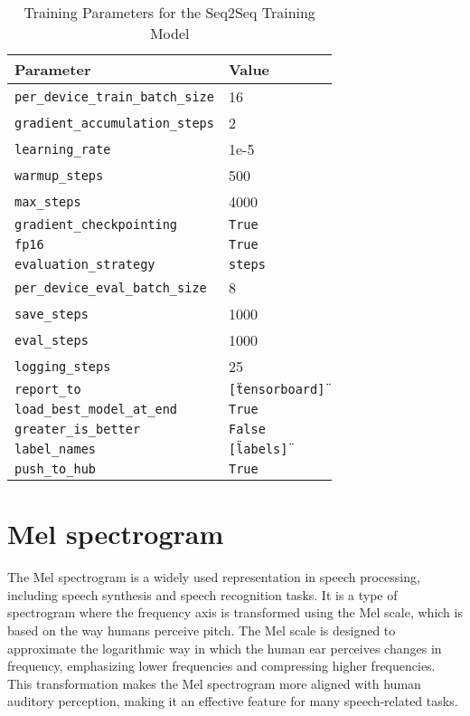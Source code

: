 \documentclass[12pt]{article}
\begin{document}
\begin{table}[ht!]
\centering
\begin{tabular}{|l|l|}
\hline
\textbf{Parameter} & \textbf{Value} \\ \hline
\texttt{per\_device\_train\_batch\_size} & 16 \\ \hline
\texttt{gradient\_accumulation\_steps} & 2 \\ \hline
\texttt{learning\_rate} & 1e-5 \\ \hline
\texttt{warmup\_steps} & 500 \\ \hline
\texttt{max\_steps} & 4000 \\ \hline
\texttt{gradient\_checkpointing} & \texttt{True} \\ \hline
\texttt{fp16} & \texttt{True} \\ \hline
\texttt{evaluation\_strategy} & \texttt{steps} \\ \hline
\texttt{per\_device\_eval\_batch\_size} & 8 \\ \hline
\texttt{save\_steps} & 1000 \\ \hline
\texttt{eval\_steps} & 1000 \\ \hline
\texttt{logging\_steps} & 25 \\ \hline
\texttt{report\_to} & \texttt{[\"tensorboard\"]} \\ \hline
\texttt{load\_best\_model\_at\_end} & \texttt{True} \\ \hline
\texttt{greater\_is\_better} & \texttt{False} \\ \hline
\texttt{label\_names} & \texttt{[\"labels\"]} \\ \hline
\texttt{push\_to\_hub} & \texttt{True} \\ \hline
\end{tabular}
\caption{Training Parameters for the Seq2Seq Training Model}
\end{table}

\section{Mel spectrogram}
The Mel spectrogram is a widely used representation in speech processing, including speech synthesis and speech recognition tasks. It is a type of spectrogram where the frequency axis is transformed using the Mel scale, which is based on the way humans perceive pitch. The Mel scale is designed to approximate the logarithmic way in which the human ear perceives changes in frequency, emphasizing lower frequencies and compressing higher frequencies. This transformation makes the Mel spectrogram more aligned with human auditory perception, making it an effective feature for many speech-related tasks.
\end{document}
